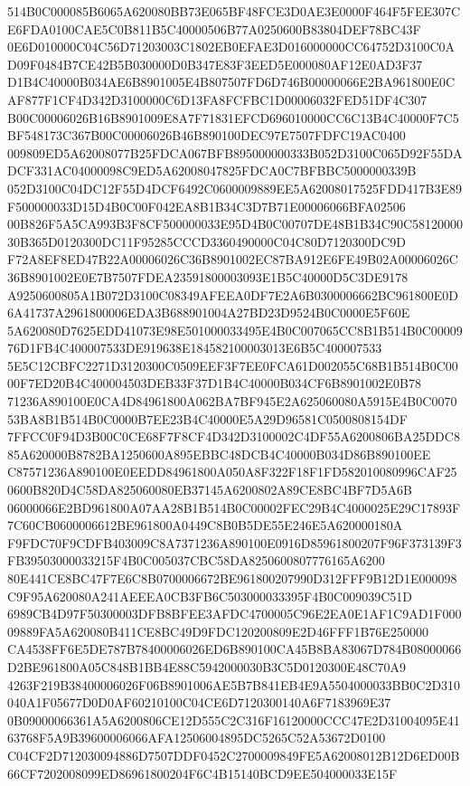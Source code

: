 \documentclass[UTF8,fontset=fandol,zihao=-4,a4paper]{ctexart}
\begin{document}
{{514B0C000085B6065A620080BB73E065BF48FCE3D0AE3E0000F464F5FEE307CE6FDA0100CAE5C0B811B5C40000506B77A0250600B83804DEF78BC43F
0E6D010000C04C56D71203003C1802EB0EFAE3D016000000CC64752D3100C0AD09F0484B7CE42B5B030000D0B347E83F3EED5E000080AF12E0AD3F37
D1B4C40000B034AE6B8901005E4B807507FD6D746B00000066E2BA961800E0CAF877F1CF4D342D3100000C6D13FA8FCFBC1D00006032FED51DF4C307
B00C00006026B16B8901009E8A7F71831EFCD696010000CC6C13B4C40000F7C5BF548173C367B00C00006026B46B890100DEC97E7507FDFC19AC0400
009809ED5A62008077B25FDCA067BFB895000000333B052D3100C065D92F55DADCF331AC04000098C9ED5A62008047825FDCA0C7BFBBC5000000339B
052D3100C04DC12F55D4DCF6492C0600009889EE5A62008017525FDD417B3E89F500000033D15D4B0C00F042EA8B1B34C3D7B71E00006066BFA02506
00B826F5A5CA993B3F8CF500000033E95D4B0C00707DE48B1B34C90C5812000030B365D0120300DC11F95285CCCD3360490000C04C80D7120300DC9D
F72A8EF8ED47B22A00006026C36B8901002EC87BA912E6FE49B02A00006026C36B8901002E0E7B7507FDEA23591800003093E1B5C40000D5C3DE9178
A9250600805A1B072D3100C08349AFEEA0DF7E2A6B0300006662BC961800E0D6A41737A2961800006EDA3B688901004A27BD23D9524B0C0000E5F60E
5A620080D7625EDD41073E98E501000033495E4B0C007065CC8B1B514B0C0000976D1FB4C400007533DE919638E184582100003013E6B5C400007533
5E5C12CBFC2271D3120300C0509EEF3F7EE0FCA61D002055C68B1B514B0C0000F7ED20B4C400004503DEB33F37D1B4C40000B034CF6B8901002E0B78
71236A890100E0CA4D84961800A062BA7BF945E2A625060080A5915E4B0C007053BA8B1B514B0C0000B7EE23B4C40000E5A29D96581C0500808154DF
7FFCC0F94D3B00C0CE68F7F8CF4D342D3100002C4DF55A6200806BA25DDC885A620000B8782BA1250600A895EBBC48DCB4C40000B034D86B890100EE
C87571236A890100E0EEDD84961800A050A8F322F18F1FD582010080996CAF250600B820D4C58DA825060080EB37145A6200802A89CE8BC4BF7D5A6B
06000066E2BD961800A07AA28B1B514B0C00002FEC29B4C4000025E29C17893F7C60CB0600006612BE961800A0449C8B0B5DE55E246E5A620000180A
F9FDC70F9CDFB403009C8A7371236A890100E0916D85961800207F96F373139F3FB39503000033215F4B0C005037CBC58DA8250600807776165A6200
80E441CE8BC47F7E6C8B0700006672BE961800207990D312FFF9B12D1E000098C9F95A620080A241AEEEA0CB3FB6C503000033395F4B0C009039C51D
6989CB4D97F50300003DFB8BFEE3AFDC4700005C96E2EA0E1AF1C9AD1F00009889FA5A620080B411CE8BC49D9FDC120200809E2D46FFF1B76E250000
CA4538FF6E5DE787B78400006026ED6B890100CA45B8BA83067D784B08000066D2BE961800A05C848B1BB4E88C5942000030B3C5D0120300E48C70A9
4263F219B38400006026F06B8901006AE5B7B841EB4E9A5504000033BB0C2D310040A1F05677D0D0AF60210100C04CE6D7120300140A6F7183969E37
0B09000066361A5A6200806CE12D555C2C316F16120000CCC47E2D31004095E4163768F5A9B39600006066AFA12506004895DC5265C52A53672D0100
C04CF2D712030094886D7507DDF0452C2700009849FE5A62008012B12D6ED00B66CF7202008099ED86961800204F6C4B15140BCD9EE504000033E15F
}}
\end{document}
